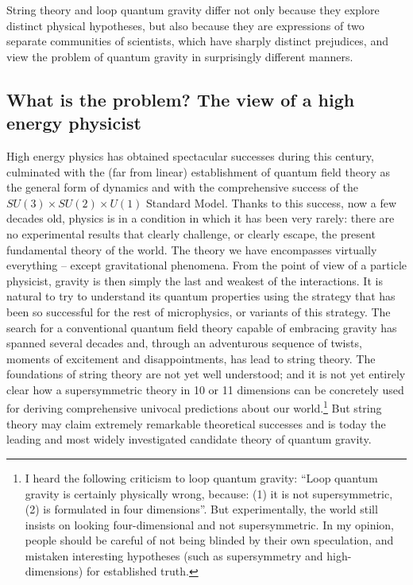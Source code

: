 \documentclass[12pt]{article}
\begin{document}
String theory and loop quantum gravity differ not only because 
they explore distinct physical hypotheses, but also because they 
are expressions of two separate communities of scientists, which 
have sharply distinct prejudices, and view the problem of quantum 
gravity in surprisingly different manners.

\subsection{What is the problem?  The view of a high energy 
physicist}

High energy physics has obtained spectacular successes during this 
century, culminated with the (far from linear) establishment of 
quantum field theory as the general form of dynamics and with the 
comprehensive success of the $SU(3)\times SU(2)\times U(1)$ Standard 
Model.  Thanks to this success, now a few decades old, physics is in a 
condition in which it has been very rarely: there are no experimental 
results that clearly challenge, or clearly escape, the present 
fundamental theory of the world.  The theory we have encompasses 
virtually everything -- except gravitational phenomena.  From the 
point of view of a particle physicist, gravity is then simply the last 
and weakest of the interactions.  It is natural to try to understand 
its quantum properties using the strategy that has been so successful 
for the rest of microphysics, or variants of this strategy.  The 
search for a conventional quantum field theory capable of embracing 
gravity has spanned several decades and, through an adventurous 
sequence of twists, moments of excitement and disappointments, has 
lead to string theory.  The foundations of string theory are not yet 
well understood; and it is not yet entirely clear how a supersymmetric 
theory in 10 or 11 dimensions can be concretely used for deriving 
comprehensive univocal predictions about our world.\footnote{I heard 
the following criticism to loop quantum gravity: ``Loop quantum 
gravity is certainly physically wrong, because: (1) it is not 
supersymmetric, (2) is formulated in four dimensions''.  But 
experimentally, the world still insists on looking four-dimensional 
and not supersymmetric.  In my opinion, people should be careful of 
not being blinded by their own speculation, and mistaken interesting 
hypotheses (such as supersymmetry and high-dimensions) for established 
truth.} But string theory may claim extremely remarkable theoretical 
successes and is today the leading and most widely investigated 
candidate theory of quantum gravity.
\end{document}
